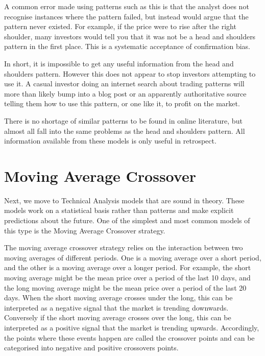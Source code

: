 \documentclass{report}
\begin{document}
A common error made using patterns such as this is that the analyst does not recognise instances where the pattern failed, but instead would argue that the pattern never existed. For example, if the price were to rise after the right shoulder, many investors would tell you that it was not be a head and shoulders pattern in the first place. This is a systematic acceptance of confirmation bias.

In short, it is impossible to get any useful information from the head and shoulders pattern. However this does not appear to stop investors attempting to use it. A casual investor doing an internet search about trading patterns will more than likely bump into a blog post or an apparently authoritative source telling them how to use this pattern, or one like it, to profit on the market. 

There is no shortage of similar patterns to be found in online literature, but almost all fall into the same problems as the head and shoulders pattern. All information available from these models is only useful in retrospect. 

\section{Moving Average Crossover}

Next, we move to Technical Analysis models that are sound in theory. These models work on a statistical basis rather than patterns and make explicit predictions about the future. One of the simplest and most common models of this type is the Moving Average Crossover strategy.

The moving average crossover strategy relies on the interaction between two moving averages of different periods. One is a moving average over a short period, and the other is a moving average over a longer period. For example, the short moving average might be the mean price over a period of the last 10 days, and the long moving average might be the mean price over a period of the last 20 days. When the short moving average crosses under the long, this can be interpreted as a negative signal that the market is trending downwards. Conversely if the short moving average crosses over the long, this can be interpreted as a positive signal that the market is trending upwards. Accordingly, the points where these events happen are called the crossover points and can be categorised into negative and positive crossovers points.
\end{document}
